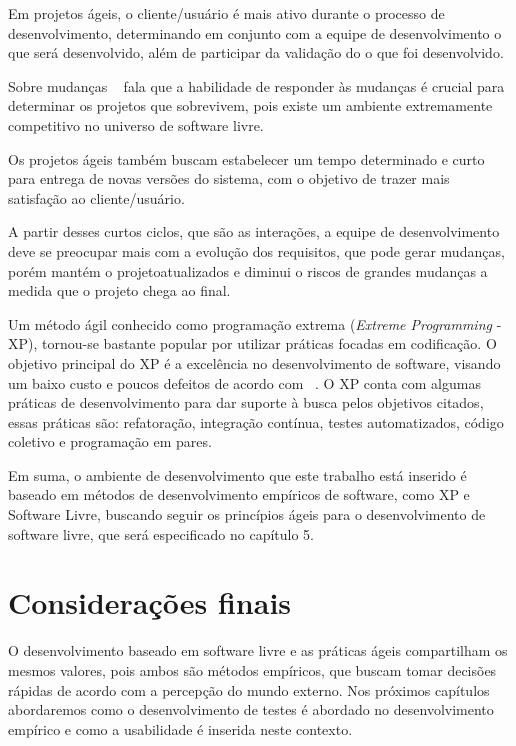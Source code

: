 Em projetos ágeis, o cliente/usuário é mais ativo durante o processo de desenvolvimento, determinando em conjunto com a equipe de desenvolvimento o que será desenvolvido, além de participar da validação do o que foi desenvolvido.

Sobre mudanças ~ fala que a habilidade de responder às mudanças é crucial para determinar os projetos que sobrevivem, pois existe um ambiente extremamente competitivo no universo de software livre.

Os projetos ágeis também buscam estabelecer um tempo determinado e curto para entrega de novas versões do sistema, com o objetivo de trazer mais satisfação ao cliente/usuário.

A partir desses curtos ciclos, que são as interações, a equipe de desenvolvimento 
deve se preocupar mais com a evolução dos requisitos, que pode gerar mudanças, porém 
mantém o projetoatualizados e diminui o riscos de grandes mudanças a medida que o 
projeto chega ao final.

Um método ágil conhecido como programação extrema (\emph{Extreme Programming} - XP), 
tornou-se bastante popular por utilizar práticas focadas em codificação.
%
O objetivo principal do XP é a excelência no desenvolvimento de software, visando 
um baixo custo e poucos defeitos de acordo com ~. O XP conta com algumas práticas de desenvolvimento para dar suporte à busca pelos objetivos citados, essas práticas são: refatoração, integração contínua, testes automatizados, código coletivo e programação em pares.

Em suma, o ambiente de desenvolvimento que este trabalho está inserido é baseado em métodos de desenvolvimento empíricos de software, como XP e Software Livre, buscando seguir os princípios ágeis para o desenvolvimento de software livre, que será especificado no capítulo 5.


\section{Considerações finais}

O desenvolvimento baseado em software livre e as práticas ágeis compartilham os mesmos valores, pois ambos são métodos empíricos, que buscam tomar decisões rápidas de acordo com a percepção do mundo externo. Nos próximos capítulos abordaremos como o desenvolvimento de testes é abordado no desenvolvimento empírico e como a usabilidade é inserida neste contexto.



